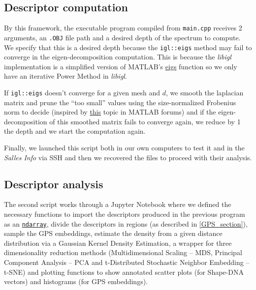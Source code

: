 \documentclass[conference]{IEEEtran}
\newcommand{\q}[1]{``#1''} %
\begin{document}
\subsection{Descriptor computation}

By this framework, the executable program compiled from \texttt{main.cpp} receives 2 arguments, an \texttt{.OBJ} file path and a desired depth of the spectrum to compute. We specify that this is a desired depth because the \texttt{igl::eigs} method may fail to converge in the eigen-decomposition computation. This is because the \emph{libigl} implementation is a simplified version of MATLAB's \href{https://www.mathworks.com/help/matlab/ref/eigs.html}{eigs} function so we only have an iterative Power Method in \emph{libigl}.

If \texttt{igl::eigs} doesn't converge for a given mesh and $d$, we smooth the laplacian matrix and prune the \q{too small} values using the size-normalized Frobenius norm to decide (inspired by \href{https://www.mathworks.com/matlabcentral/answers/172633-eig-doesn-t-converge-can-you-explain-why}{this} topic in MATLAB forums) and if the eigen-decomposition of this smoothed matrix fails to converge again, we reduce by 1 the depth and we start the computation again.

Finally, we launched this script both in our own computers to test it and in the \emph{Salles Info} via SSH and then we recovered the files to proceed with their analysis.

\subsection{Descriptor analysis}

The second script works through a Jupyter Notebook where we defined the necessary functions to import the descriptors produced in the previous program as an \href{https://docs.scipy.org/doc/numpy/reference/arrays.ndarray.html}{\texttt{ndarray}}, divide the descriptors in regions (as described in \ref{GPS_section}), sample the GPS embeddings, estimate the density from a given distance distribution via a Gaussian Kernel Density Estimation, a wrapper for three dimensionality reduction methods (Multidimensional Scaling -- MDS, Principal Component Analysis -- PCA and t-Distributed Stochastic Neighbor Embedding -- t-SNE) and plotting functions to show annotated scatter plots (for Shape-DNA vectors) and histograms (for GPS embeddings).
\end{document}
